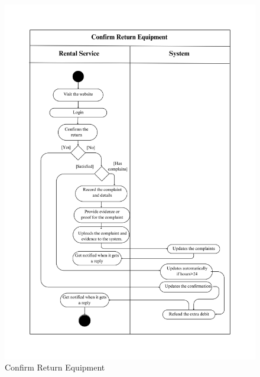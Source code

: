 \begin{figure}[h]
    \centering
    \includegraphics[width=1\textwidth]{Images/Activity Diagrams/35 Confirm Return Equipment.png}
    \caption{Confirm Return Equipment}
    \label{fig:activity-confirm-return}
\end{figure}

